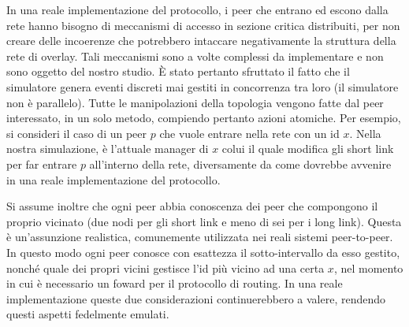\documentclass[prodmode,acmtap]{acmlarge}
\begin{document}

In una reale implementazione del protocollo, i peer che entrano ed escono dalla rete hanno bisogno di meccanismi di accesso in sezione critica distribuiti, per non creare delle incoerenze che potrebbero intaccare negativamente la struttura della rete di overlay. Tali meccanismi sono a volte complessi da implementare e non sono oggetto del nostro studio. È stato pertanto sfruttato il fatto che il simulatore genera eventi discreti mai gestiti in concorrenza tra loro (il simulatore non è parallelo). Tutte le manipolazioni della topologia vengono fatte dal peer interessato, in un solo metodo, compiendo pertanto azioni atomiche. Per esempio, si consideri il caso di un peer $p$ che vuole entrare nella rete con un id $x$. Nella nostra simulazione, è l'attuale manager di $x$ colui il quale modifica gli short link per far entrare $p$ all'interno della rete, diversamente da come dovrebbe avvenire in una reale implementazione del protocollo.

Si assume inoltre che ogni peer abbia conoscenza dei peer che compongono il proprio vicinato (due nodi per gli short link e meno di sei per i long link). Questa è un'assunzione realistica, comunemente utilizzata nei reali sistemi peer-to-peer. In questo modo ogni peer conosce con esattezza il sotto-intervallo da esso gestito, nonché quale dei propri vicini gestisce l'id più vicino ad una certa $x$, nel momento in cui è necessario un foward per il protocollo di routing. In una reale implementazione queste due considerazioni continuerebbero a valere, rendendo questi aspetti fedelmente emulati.
\end{document}
